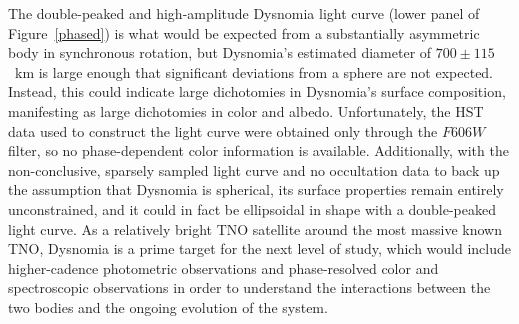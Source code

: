 \documentclass[onecolumn]{aastex631}
\begin{document}
The double-peaked and high-amplitude Dysnomia light curve (lower panel of Figure~\ref{phased}) is what would be expected from a substantially asymmetric body in synchronous rotation, but Dysnomia's estimated diameter of $700\pm115$~km \citep{BB2018} is large enough that significant deviations from a sphere are not expected. Instead, this could indicate large dichotomies in Dysnomia's surface composition, manifesting as large dichotomies in color and albedo. Unfortunately, the HST data used to construct the light curve were obtained only through the $F606W$ filter, so no phase-dependent color information is available. Additionally, with the non-conclusive, sparsely sampled light curve and no occultation data to back up the assumption that Dysnomia is spherical, its surface properties remain entirely unconstrained, and it could in fact be ellipsoidal in shape with a double-peaked light curve. As a relatively bright TNO satellite around the most massive known TNO, Dysnomia is a prime target for the next level of study, which would include higher-cadence photometric observations and phase-resolved color and spectroscopic observations in order to understand the interactions between the two bodies and the ongoing evolution of the system.
\end{document}
